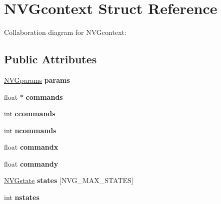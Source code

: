 \hypertarget{struct_n_v_gcontext}{\section{N\+V\+Gcontext Struct Reference}
\label{struct_n_v_gcontext}
}


Collaboration diagram for N\+V\+Gcontext\+:
\subsection*{Public Attributes}
\begin{DoxyCompactItemize}
\item 
\hypertarget{struct_n_v_gcontext_a388599d05b847451e410c402567cdfc5}{\hyperlink{struct_n_v_gparams}{N\+V\+Gparams} {\bfseries params}}\label{struct_n_v_gcontext_a388599d05b847451e410c402567cdfc5}

\item 
\hypertarget{struct_n_v_gcontext_a24bc3804b6b64c955e7318835f033f31}{float $\ast$ {\bfseries commands}}\label{struct_n_v_gcontext_a24bc3804b6b64c955e7318835f033f31}

\item 
\hypertarget{struct_n_v_gcontext_abdd400974a0e442333120fb98d5e49e7}{int {\bfseries ccommands}}\label{struct_n_v_gcontext_abdd400974a0e442333120fb98d5e49e7}

\item 
\hypertarget{struct_n_v_gcontext_af3583d9602e9ea415b01c2692392a02a}{int {\bfseries ncommands}}\label{struct_n_v_gcontext_af3583d9602e9ea415b01c2692392a02a}

\item 
\hypertarget{struct_n_v_gcontext_abe9bb2cd4ee241f6bf9d1dc5ca1b2d5c}{float {\bfseries commandx}}\label{struct_n_v_gcontext_abe9bb2cd4ee241f6bf9d1dc5ca1b2d5c}

\item 
\hypertarget{struct_n_v_gcontext_a93da42b3cceca9295f2d61bd6291aba5}{float {\bfseries commandy}}\label{struct_n_v_gcontext_a93da42b3cceca9295f2d61bd6291aba5}

\item 
\hypertarget{struct_n_v_gcontext_aec646e1bdb22b7ac83fda005ab43f026}{\hyperlink{struct_n_v_gstate}{N\+V\+Gstate} {\bfseries states} \mbox{[}N\+V\+G\+\_\+\+M\+A\+X\+\_\+\+S\+T\+A\+T\+E\+S\mbox{]}}\label{struct_n_v_gcontext_aec646e1bdb22b7ac83fda005ab43f026}

\item 
\hypertarget{struct_n_v_gcontext_ac38f94f78cc3eeed7c8c1cb033e5b7ab}{int {\bfseries nstates}}\label{struct_n_v_gcontext_ac38f94f78cc3eeed7c8c1cb033e5b7ab}


\end{DoxyCompactItemize}
